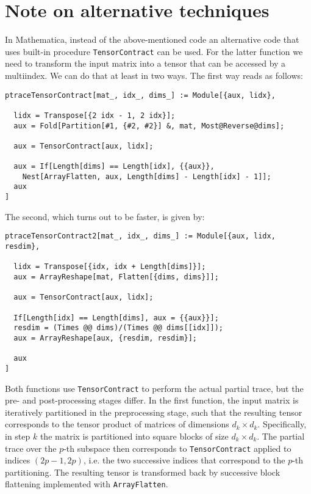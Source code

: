 \documentclass[nofootinbib,superscriptaddress,longbibliography,a4paper,amsfonts]{revtex4-2}
\begin{document}
\section{Note on alternative techniques}

In Mathematica, instead of the above-mentioned code an alternative code that uses built-in procedure \verb+TensorContract+ can be used. For the latter function we need to transform the input matrix into a tensor that can be accessed by a multiindex. We can do that at least in two ways. The first way reads as follows:

\begin{verbatim}
ptraceTensorContract[mat_, idx_, dims_] := Module[{aux, lidx},
  
  lidx = Transpose[{2 idx - 1, 2 idx}];
  aux = Fold[Partition[#1, {#2, #2}] &, mat, Most@Reverse@dims];
  
  aux = TensorContract[aux, lidx];
  
  aux = If[Length[dims] == Length[idx], {{aux}}, 
    Nest[ArrayFlatten, aux, Length[dims] - Length[idx] - 1]];
  aux
]
\end{verbatim}

The second, which turns out to be faster, is given by:

\begin{verbatim}
ptraceTensorContract2[mat_, idx_, dims_] := Module[{aux, lidx, resdim},
  
  lidx = Transpose[{idx, idx + Length[dims]}];
  aux = ArrayReshape[mat, Flatten[{dims, dims}]];
  
  aux = TensorContract[aux, lidx];
  
  If[Length[idx] == Length[dims], aux = {{aux}}];
  resdim = (Times @@ dims)/(Times @@ dims[[idx]]);
  aux = ArrayReshape[aux, {resdim, resdim}];
  
  aux
]
\end{verbatim}

Both functions use \verb+TensorContract+ to perform the actual partial trace, but the pre- and post-processing stages differ. In the first function, the input matrix is iteratively partitioned in the preprocessing stage, such that the resulting tensor corresponds to the tensor product of matrices of dimensions $d_k \times d_k$. Specifically, in step $k$ the matrix is partitioned into square blocks of size $d_k \times d_k$. The partial trace over the $p$-th subspace then corresponds to \verb+TensorContract+ applied to indices $(2 p-1, 2 p)$, i.e. the two successive indices that correspond to the $p$-th partitioning. The resulting tensor is transformed back by successive block flattening implemented with \verb+ArrayFlatten+.
\end{document}
